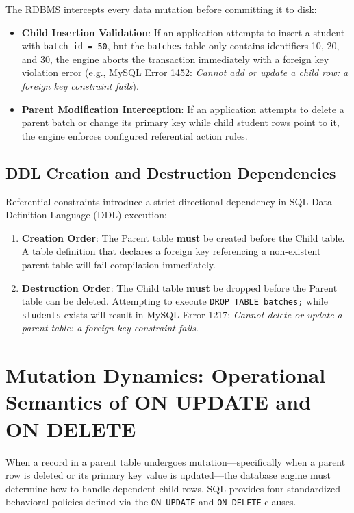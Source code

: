 \documentclass[10pt,journal,compsoc,onecolumn]{IEEEtran}
\begin{document}
The RDBMS intercepts every data mutation before committing it to disk:
\begin{itemize}
    \item \textbf{Child Insertion Validation}: If an application attempts to insert a student with \texttt{batch\_id = 50}, but the \texttt{batches} table only contains identifiers 10, 20, and 30, the engine aborts the transaction immediately with a foreign key violation error (e.g., MySQL Error 1452: \textit{Cannot add or update a child row: a foreign key constraint fails}).
    \item \textbf{Parent Modification Interception}: If an application attempts to delete a parent batch or change its primary key while child student rows point to it, the engine enforces configured referential action rules.
\end{itemize}

\subsection{DDL Creation and Destruction Dependencies}
Referential constraints introduce a strict directional dependency in SQL Data Definition Language (DDL) execution:
\begin{enumerate}
    \item \textbf{Creation Order}: The Parent table \textbf{must} be created before the Child table. A table definition that declares a foreign key referencing a non-existent parent table will fail compilation immediately.
    \item \textbf{Destruction Order}: The Child table \textbf{must} be dropped before the Parent table can be deleted. Attempting to execute \texttt{DROP TABLE batches;} while \texttt{students} exists will result in MySQL Error 1217: \textit{Cannot delete or update a parent table: a foreign key constraint fails}.
\end{enumerate}

\section{Mutation Dynamics: Operational Semantics of ON UPDATE and ON DELETE}
\label{sec:mutation_rules}

When a record in a parent table undergoes mutation---specifically when a parent row is deleted or its primary key value is updated---the database engine must determine how to handle dependent child rows. SQL provides four standardized behavioral policies defined via the \texttt{ON UPDATE} and \texttt{ON DELETE} clauses.
\end{document}
